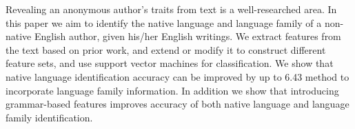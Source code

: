 Revealing an anonymous author's traits from text is a well-researched area. In this paper we aim to identify the native language and language family of a
 non-native English author, given his/her English writings. We extract features
 from the text based on prior work, and extend or modify it to construct
 different feature sets, and use support vector machines for classification. We
 show that native language identification accuracy can be improved by up to
 6.43%
 method to incorporate language family information. In addition we show that
 introducing grammar-based features improves accuracy of both native language
 and language family identification.

